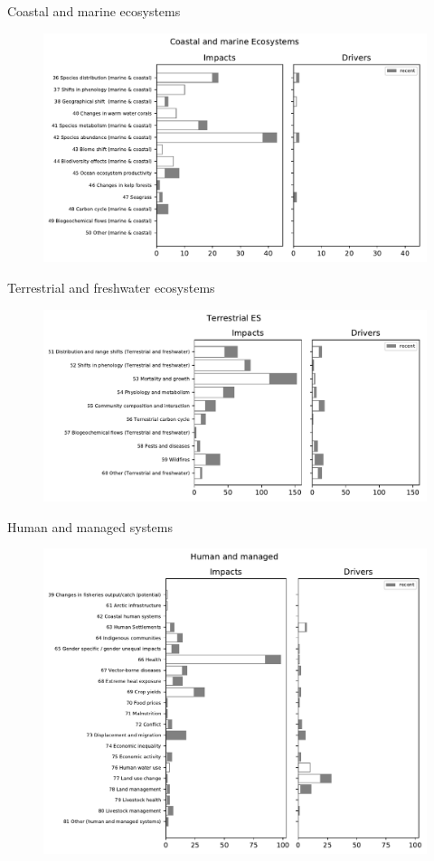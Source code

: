 \documentclass[9pt]{beamer}
\begin{document}
\begin{frame}[label=Mar]{Coastal and marine ecosystems}
\begin{figure}
	\includegraphics[width=\linewidth]{../plots/progress/cats_labels_Coastal_and_marine_Ecosystems.pdf}
\end{figure}
\end{frame}

\begin{frame}[label=TES]{Terrestrial and freshwater ecosystems}
\begin{figure}
	\includegraphics[width=\linewidth]{../plots/progress/cats_labels_Terrestrial_ES.pdf}
\end{figure}
\end{frame}

\begin{frame}[label=Hum]{Human and managed systems}
\begin{figure}
	\includegraphics[width=\linewidth]{../plots/progress/cats_labels_Human_and_managed.pdf}
\end{figure}
\end{frame}
\end{document}
